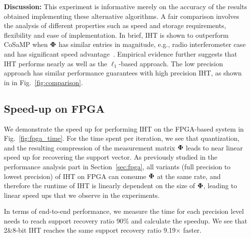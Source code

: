 \documentclass{article}
\begin{document}
{{\bf Discussion:} This experiment is informative merely on the accuracy of the results obtained implementing these alternative algorithms. A fair comparison involves the analysis of different properties such as speed and storage requirements, flexibility and ease of implementation. In brief, 
IHT is shown to outperform CoSaMP when ${\bf \Phi}$ has similar entries in magnitude, e.g., radio interferometer case and has significant speed advantage~\cite{blumensath2012greedy}. Empirical evidence further suggests that IHT performs nearly as well as the $\ell_1$-based approach. %
The low precision approach has similar performance guarantees with high precision IHT, as shown
in in Fig.~\ref{fig:comparison}.



\subsection{Speed-up on FPGA}

We demonstrate the speed up for performing IHT on the FPGA-based system in Fig.~\ref{fig:fpga_time}. For the time spent per iteration, we see that quantization, and the resulting compression of the measurement matrix ${\bf \Phi}$ leads to near linear speed up for recovering the support vector. As previously studied in the performance analysis part in Section~\ref{sec:fpga}, all variants (full precision to lowest precision) of IHT on FPGA can consume ${\bf \Phi}$ at the same rate, and therefore the runtime of IHT is linearly dependent on the size of ${\bf \Phi}$, leading to linear speed ups that we observe in the experiments.

In terms of end-to-end performance, we measure the time for
each precision level needs to reach support recovery
ratio 90\% and calculate the speedup. We see 
that 2\&8-bit IHT reaches the same support recovery
ratio 9.19$\times$ faster.



}
\end{document}
